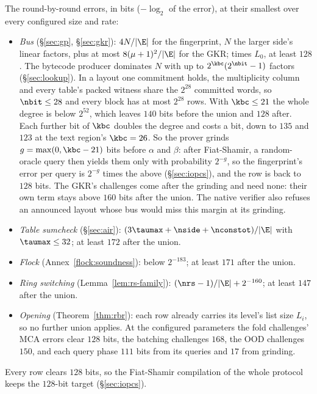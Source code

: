 The round-by-round errors, in bits ($-\log_2$ of the error), at their smallest over every configured size and rate:
\begin{itemize}[itemsep=1pt,topsep=3pt]
\item \emph{Bus} (\S\ref{sec:gp}, \S\ref{sec:gkr}): $4N/|\E|$ for the fingerprint, $N$ the larger side's linear factors, plus at most $8(\mu+1)^2/|\E|$ for the GKR; times $L_0$, at least $128$. The bytecode producer dominates $N$ with up to $2^{\kbc}(2^{\nbit}-1)$ factors (\S\ref{sec:lookup}). In a layout one commitment holds, the multiplicity column and every table's packed witness share the $2^{28}$ committed words, so $\nbit\le28$ and every block has at most $2^{28}$ rows. With $\kbc\le21$ the whole degree is below $2^{52}$, which leaves $140$ bits before the union and $128$ after. Each further bit of $\kbc$ doubles the degree and costs a bit, down to $135$ and $123$ at the text region's $\kbc=26$. So the prover grinds $g=\max(0,\kbc-21)$ bits before $\alpha$ and $\beta$: after Fiat-Shamir, a random-oracle query then yields them only with probability $2^{-g}$, so the fingerprint's error per query is $2^{-g}$ times the above (\S\ref{sec:iopcs}), and the row is back to $128$ bits. The GKR's challenges come after the grinding and need none: their own term stays above $160$ bits after the union. The native verifier also refuses an announced layout whose bus would miss this margin at its grinding.
\item \emph{Table sumcheck} (\S\ref{sec:air}): $(3\taumax+\nside+\nconstot)/|\E|$ with $\taumax\le32$; at least $172$ after the union.
\item \emph{Flock} (Annex~\ref{flock:soundness}): below $2^{-183}$; at least $171$ after the union.
\item \emph{Ring switching} (Lemma~\ref{lem:rs-family}): $(\nrs-1)/|\E|+2^{-160}$; at least $147$ after the union.
\item \emph{Opening} (Theorem~\ref{thm:rbr}): each row already carries its level's list size $L_i$, so no further union applies. At the configured parameters the fold challenges' MCA errors clear $128$ bits, the batching challenges $168$, the OOD challenges $150$, and each query phase $111$ bits from its queries and $17$ from grinding.
\end{itemize}
Every row clears $128$ bits, so the Fiat-Shamir compilation of the whole protocol keeps the $128$-bit target (\S\ref{sec:iopcs}).
